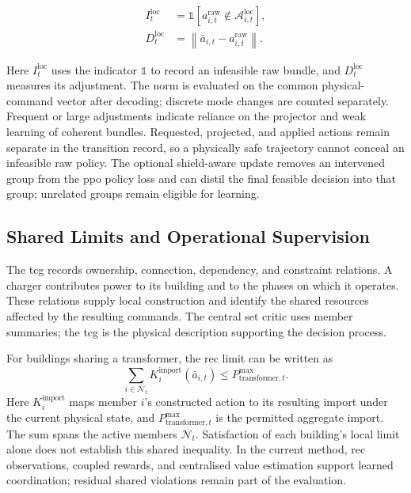 \begin{align}
I^{\mathrm{loc}}_t
&=\mathbb{1}\left[a^{\mathrm{raw}}_{i,t}\notin\mathcal{A}^{\mathrm{loc}}_{i,t}\right],\\
D^{\mathrm{loc}}_t
&=\left\|\bar{a}_{i,t}-a^{\mathrm{raw}}_{i,t}\right\|.
\end{align}

Here $I^{\mathrm{loc}}_t$ uses the indicator $\mathbb 1$ to record an infeasible raw bundle, and $D^{\mathrm{loc}}_t$ measures its adjustment. The norm is evaluated on the common physical-command vector after decoding; discrete mode changes are counted separately. Frequent or large adjustments indicate reliance on the projector and weak learning of coherent bundles. Requested, projected, and applied actions remain separate in the transition record, so a physically safe trajectory cannot conceal an infeasible raw policy. The optional shield-aware update removes an intervened group from the \gls{ppo} policy loss and can distil the final feasible decision into that group; unrelated groups remain eligible for learning.

\subsection{Shared Limits and Operational Supervision}
\label{sec:timarl-tcg}
\label{sec:timarl-shared-monitor}
\label{sec:timarl-runtime-assurance}

The \gls{tcg} records ownership, connection, dependency, and constraint relations. A charger contributes power to its building and to the phases on which it operates. These relations supply local construction and identify the shared resources affected by the resulting commands. The central set critic uses member summaries; the \gls{tcg} is the physical description supporting the decision process.

For buildings sharing a transformer, the \gls{rec} limit can be written as
\begin{equation}
\sum_{i\in\mathcal N_t}K_i^{\mathrm{import}}(\bar a_{i,t})
\leq P^{\max}_{\mathrm{transformer},t}.
\label{eq:running-shared-constraint}
\end{equation}
Here $K_i^{\mathrm{import}}$ maps member $i$'s constructed action to its resulting import under the current physical state, and $P^{\max}_{\mathrm{transformer},t}$ is the permitted aggregate import. The sum spans the active members $\mathcal N_t$. Satisfaction of each building's local limit alone does not establish this shared inequality. In the current method, \gls{rec} observations, coupled rewards, and centralised value estimation support learned coordination; residual shared violations remain part of the evaluation.

